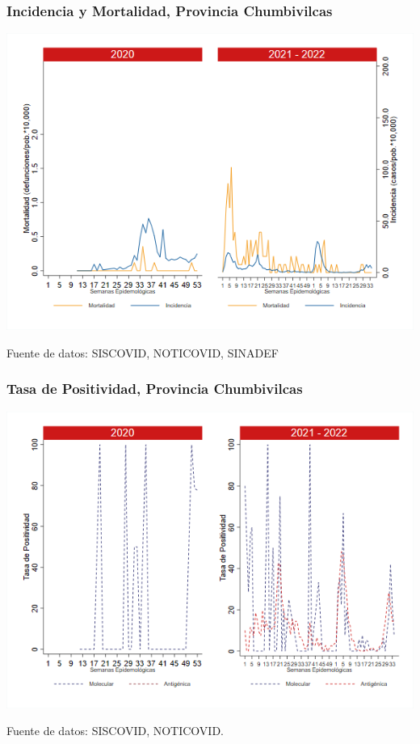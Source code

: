 \documentclass[xcolor=table]{beamer}
\begin{document}
\begin{frame}[label=Chumbivilcas]
	\frametitle{Incidencia y Mortalidad, Provincia Chumbivilcas}
	\vspace{-.5cm}
	\begin{center}
		\includegraphics[width=0.8\linewidth, trim={0cm .5cm 0cm 0.2cm},clip]{../figuras/incidencia_mortalidad_20_21_6.png}
	\end{center}
	{\tiny Fuente de datos: SISCOVID, NOTICOVID, SINADEF}
\end{frame}

\begin{frame}
	\frametitle{Tasa de Positividad, Provincia Chumbivilcas}
	\vspace{-.5cm}
	\begin{center}
		\includegraphics[width=0.8\linewidth, trim={0cm .5cm 0cm 0.2cm},clip]{../figuras/positividad_20_21_6.png}
	\end{center}
	{\tiny Fuente de datos: SISCOVID, NOTICOVID.}
\end{frame}
\end{document}
